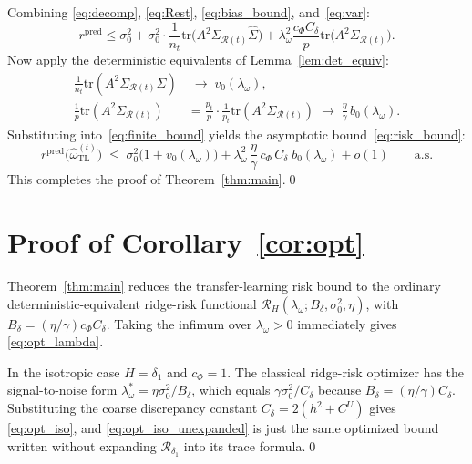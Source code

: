 \documentclass[11pt]{article}
\theoremstyle{definition}
\newcommand{\Rt}{\mathcal{R}(t)}
\newcommand{\SigR}{\Sigma_{\Rt}}
\newcommand{\hSig}{\widehat{\Sigma}}
\newcommand{\ohat}{\hat{\omega}}
\newcommand{\tr}{\mathrm{tr}}
\begin{document}
Combining \eqref{eq:decomp}, \eqref{eq:Rest}, \eqref{eq:bias_bound},
and~\eqref{eq:var}:
\begin{equation}\label{eq:finite_bound}
  r^{\mathrm{pred}}
  \le
  \sigma_0^2
  +\sigma_0^2\cdot\frac{1}{n_t}\tr\bigl(A^2\SigR\hSig\bigr)
  +\lambda_\omega^2\frac{c_\Phi C_\delta}{p}
    \tr\bigl(A^2\SigR\bigr).
\end{equation}
Now apply the deterministic equivalents of Lemma~\ref{lem:det_equiv}:
\begin{align*}
  \frac{1}{n_t}\tr(A^2\SigR\hSig)
  &\;\longrightarrow\; v_0(\lambda_\omega),\\[4pt]
  \frac{1}{p}\tr(A^2\SigR)
  &=\frac{p_t}{p}\cdot
    \frac{1}{p_t}\tr(A^2\SigR)
  \;\longrightarrow\;
  \frac{\eta}{\gamma}\,b_0(\lambda_\omega).
\end{align*}
Substituting into~\eqref{eq:finite_bound} yields the asymptotic
bound~\eqref{eq:risk_bound}:
\[
  r^{\mathrm{pred}}\!\bigl(\ohat_{\mathrm{TL}}^{(t)}\bigr)
  \;\le\;
  \sigma_0^2\bigl(1+v_0(\lambda_\omega)\bigr)
  +\lambda_\omega^2\,\frac{\eta}{\gamma}\,c_\Phi\,C_\delta\;
  b_0(\lambda_\omega)
  +o(1)\qquad\text{a.s.}
\]
This completes the proof of Theorem~\ref{thm:main}.\qed
 
\section{Proof of Corollary~\ref{cor:opt}}
\label{sec:proof_opt}
 
Theorem~\ref{thm:main} reduces the transfer-learning risk bound to the
ordinary deterministic-equivalent ridge-risk functional
$\mathcal R_H(\lambda_\omega;B_\delta,\sigma_0^2,\eta)$, with
$B_\delta=(\eta/\gamma)c_\Phi C_\delta$.  Taking the infimum over
$\lambda_\omega>0$ immediately gives \eqref{eq:opt_lambda}.

In the isotropic case $H=\delta_1$ and $c_\Phi=1$.  The classical
ridge-risk optimizer has the signal-to-noise form
$\lambda_\omega^*=\eta\sigma_0^2/B_\delta$, which equals
$\gamma\sigma_0^2/C_\delta$ because
$B_\delta=(\eta/\gamma)C_\delta$.  Substituting the coarse discrepancy
constant $C_\delta=2(h^2+C^U)$ gives \eqref{eq:opt_iso}, and
\eqref{eq:opt_iso_unexpanded} is just the same optimized bound written
without expanding $\mathcal R_{\delta_1}$ into its trace formula.\qed
 
\end{document}
